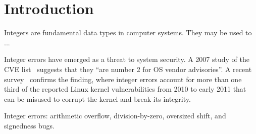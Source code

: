 \section{Introduction}
\label{s:intro}

Integers are fundamental data types in computer systems.
They may be used to ...

Integer errors have emerged as a threat to system security. A 2007
study of the CVE list~\cite{christey:vuln} suggests that they ``are
number 2 for OS vendor advisories''.  A recent survey~\cite{chen:kbugs}
confirms the finding, where integer errors account for more than
one third of the reported Linux kernel vulnerabilities from 2010
to early 2011 that can be misused to corrupt the kernel and break
its integrity.

Integer errors:
arithmetic overflow,
division-by-zero,
oversized shift, and
signedness bugs.
